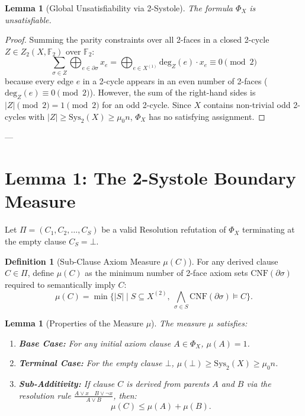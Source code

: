 \documentclass[11pt,a4paper]{article}
\theoremstyle{plain}
\newtheorem{lemma}[theorem]{Lemma}
\theoremstyle{definition}
\newtheorem{definition}[theorem]{Definition}
\theoremstyle{remark}
\begin{document}
\begin{lemma}[Global Unsatisfiability via 2-Systole]
The formula $\Phi_X$ is unsatisfiable.
\end{lemma}

\begin{proof}
Summing the parity constraints over all 2-faces in a closed 2-cycle $Z \in Z_2(X, \mathbb{F}_2)$ over $\mathbb{F}_2$:
\[
\sum_{\sigma \in Z} \bigoplus_{e \in \partial \sigma} x_e = \bigoplus_{e \in X^{(1)}} \mathrm{deg}_Z(e) \cdot x_e \equiv 0 \pmod 2
\]
because every edge $e$ in a 2-cycle appears in an even number of 2-faces ($\mathrm{deg}_Z(e) \equiv 0 \pmod 2$). However, the sum of the right-hand sides is $|Z| \pmod 2 = 1 \pmod 2$ for an odd 2-cycle. Since $X$ contains non-trivial odd 2-cycles with $|Z| \ge \mathrm{Sys}_2(X) \ge \mu_0 n$, $\Phi_X$ has no satisfying assignment.
\end{proof}

---

\section{Lemma 1: The 2-Systole Boundary Measure}

Let $\Pi = (C_1, C_2, \dots, C_S)$ be a valid Resolution refutation of $\Phi_X$ terminating at the empty clause $C_S = \bot$.

\begin{definition}[Sub-Clause Axiom Measure $\mu(C)$]
For any derived clause $C \in \Pi$, define $\mu(C)$ as the minimum number of 2-face axiom sets $\mathrm{CNF}(\partial \sigma)$ required to semantically imply $C$:
\[
\mu(C) = \min \{ |S| \mid S \subseteq X^{(2)}, \ \bigwedge_{\sigma \in S} \mathrm{CNF}(\partial \sigma) \models C \}.
\]
\end{definition}

\begin{lemma}[Properties of the Measure $\mu$]
The measure $\mu$ satisfies:
\begin{enumerate}
    \item \textbf{Base Case:} For any initial axiom clause $A \in \Phi_X$, $\mu(A) = 1$.
    \item \textbf{Terminal Case:} For the empty clause $\bot$, $\mu(\bot) \ge \mathrm{Sys}_2(X) \ge \mu_0 n$.
    \item \textbf{Sub-Additivity:} If clause $C$ is derived from parents $A$ and $B$ via the resolution rule $\frac{A \lor x \quad B \lor \neg x}{A \lor B}$, then:
    \[
    \mu(C) \le \mu(A) + \mu(B).
    \]
\end{enumerate}
\end{lemma}
\end{document}
